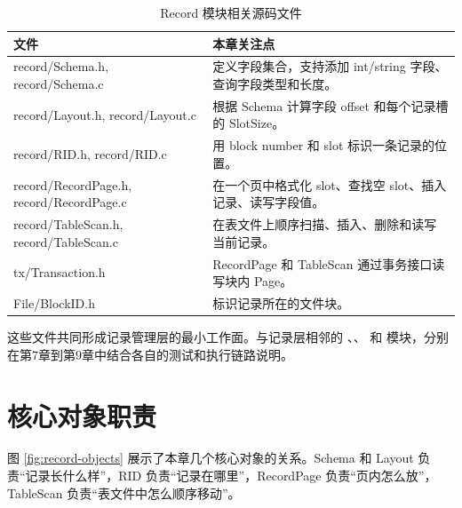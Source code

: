 \begin{table}[htbp]
  \centering
  \caption{Record 模块相关源码文件}
  \label{tab:record-source-files}
  \begin{tabularx}{\textwidth}{>{\ttfamily}l Y}
    \toprule
    文件 & 本章关注点 \\
    \midrule
    record/Schema.h, record/Schema.c & 定义字段集合，支持添加 int/string 字段、查询字段类型和长度。\\
    record/Layout.h, record/Layout.c & 根据 Schema 计算字段 offset 和每个记录槽的 SlotSize。\\
    record/RID.h, record/RID.c & 用 block number 和 slot 标识一条记录的位置。\\
    record/RecordPage.h, record/RecordPage.c & 在一个页中格式化 slot、查找空 slot、插入记录、读写字段值。\\
    record/TableScan.h, record/TableScan.c & 在表文件上顺序扫描、插入、删除和读写当前记录。\\
    tx/Transaction.h & RecordPage 和 TableScan 通过事务接口读写块内 Page。\\
    File/BlockID.h & 标识记录所在的文件块。\\
    \bottomrule
  \end{tabularx}
\end{table}

这些文件共同形成记录管理层的最小工作面。与记录层相邻的 、、 和  模块，分别在第7章到第9章中结合各自的测试和执行链路说明。

\section{核心对象职责}
\label{sec:record-objects}

图 \ref{fig:record-objects} 展示了本章几个核心对象的关系。Schema 和 Layout 负责“记录长什么样”，RID 负责“记录在哪里”，RecordPage 负责“页内怎么放”，TableScan 负责“表文件中怎么顺序移动”。

